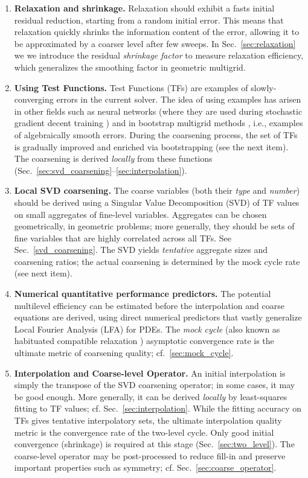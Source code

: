 \documentclass{article}
\begin{document}
\begin{enumerate}
    \item {\bf Relaxation and shrinkage.} Relaxation should exhibit a fasts initial residual reduction, starting from a random initial error. This means that relaxation quickly shrinks the information content of the error, allowing it to be approximated by a coarser level after few sweeps. In Sec.~\ref{sec:relaxation} we we introduce the residual {\it shrinkage factor} to measure relaxation efficiency, which generalizes the smoothing factor \cite[Sec.~3.1]{guide} in geometric multigrid.
    \item {\bf Using Test Functions.} Test Functions (TFs) are examples of slowly-converging errors in the current solver. The idea of using examples has arisen in other fields such as neural networks (where they are used during stochastic gradient decent training \cite{sgd}) and in bootstrap multigrid methods \cite{lamg, bamg}, i.e., examples of algebraically smooth errors. During the coarsening process, the set of TFs is gradually improved and enriched via bootstrapping (see the next item). The coarsening is derived {\it locally} from these functions (Sec.~\ref{sec:svd_coarsening}--\ref{sec:interpolation}).
    \item {\bf Local SVD coarsening.} The coarse variables (both their {\it type} and {\it number}) should be derived using a Singular Value Decomposition (SVD) of TF values on small aggregates of fine-level variables. Aggregates can be chosen geometrically, in geometric problems; more generally, they should be sets of fine variables that are highly correlated across all TFs. See Sec.~\ref{svd_coarsening}. The SVD yields {\it tentative} aggregate sizes and coarsening ratios; the actual coarsening is determined by the mock cycle rate (see next item).
    \item {\bf Numerical quantitative performance predictors.} The potential multilevel efficiency can be estimated before the interpolation and coarse equations are derived, using direct numerical predictors that vastly generalize Local Fourier Analysis (LFA) for PDEs. The {\it mock cycle} (also known as habituated compatible relaxation \cite{mg_guide, cr_oren}) asymptotic convergence rate is the ultimate metric of coarsening quality; cf.~\ref{sec:mock_cycle}.
    \item {\bf Interpolation and Coarse-level Operator.} An initial interpolation is simply the transpose of the SVD coarsening operator; in some cases, it may be good enough. More generally, it can be derived {\it locally} by least-squares fitting to TF values; cf. Sec.~\ref{sec:interpolation}. While the fitting accuracy on TFs gives tentative interpolatory sets, the ultimate interpolation quality metric is the convergence rate of the two-level cycle. Only good initial convergence (shrinkage) is required at this stage (Sec.~\ref{sec:two_level}). The coarse-level operator may be post-processed to reduce fill-in and preserve important properties such as symmetry; cf. Sec.~\ref{sec:coarse_operator}.

\end{enumerate}
\end{document}
